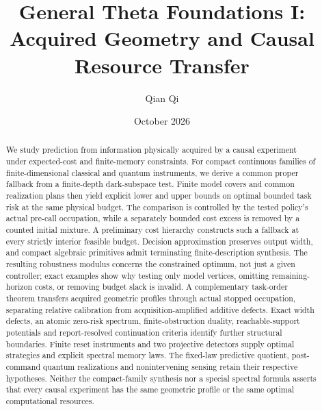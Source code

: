 
\title[Acquired geometry and causal resource transfer]{General Theta Foundations I:\\Acquired Geometry and Causal Resource Transfer}
\author{Qian Qi}\date{October 2026}

\begin{abstract}
We study prediction from information physically acquired by a causal experiment under expected-cost and finite-memory constraints. For compact continuous families of finite-dimensional classical and quantum instruments, we derive a common proper fallback from a finite-depth dark-subspace test. Finite model covers and common realization plans then yield explicit lower and upper bounds on optimal bounded task risk at the same physical budget. The comparison is controlled by the tested policy's actual pre-call occupation, while a separately bounded cost excess is removed by a counted initial mixture. A preliminary cost hierarchy constructs such a fallback at every strictly interior feasible budget. Decision approximation preserves output width, and compact algebraic primitives admit terminating finite-description synthesis. The resulting robustness modulus concerns the constrained optimum, not just a given controller; exact examples show why testing only model vertices, omitting remaining-horizon costs, or removing budget slack is invalid. A complementary task-order theorem transfers acquired geometric profiles through actual stopped occupation, separating relative calibration from acquisition-amplified additive defects. Exact width defects, an atomic zero-risk spectrum, finite-obstruction duality, reachable-support potentials and report-resolved continuation criteria identify further structural boundaries. Finite reset instruments and two projective detectors supply optimal strategies and explicit spectral memory laws. The fixed-law predictive quotient, post-command quantum realizations and nonintervening sensing retain their respective hypotheses. Neither the compact-family synthesis nor a special spectral formula asserts that every causal experiment has the same geometric profile or the same optimal computational resources.
\end{abstract}
\maketitle
